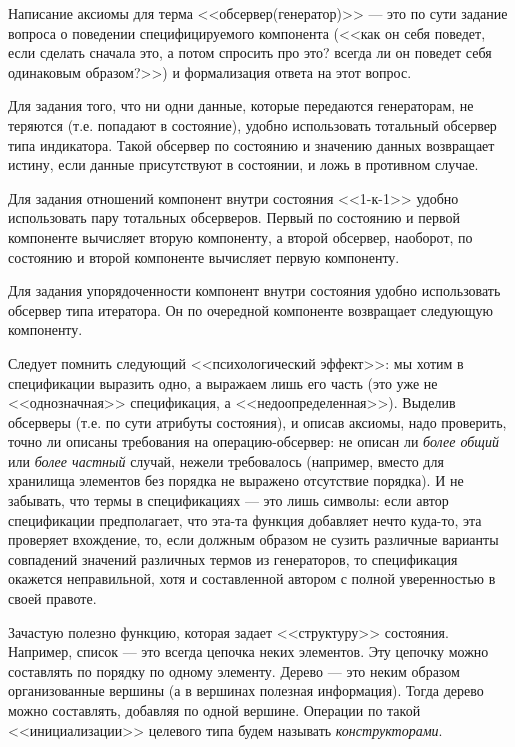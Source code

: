 Написание аксиомы для терма <<обсервер(генератор)>> --- это по сути задание вопроса о поведении специфицируемого компонента (<<как он себя поведет, если сделать сначала это, а потом спросить про это? всегда ли он поведет себя одинаковым образом?>>) и формализация ответа на этот вопрос.

Для задания того, что ни одни данные, которые передаются генераторам, не теряются (т.е. попадают в состояние), удобно использовать тотальный обсервер типа индикатора. Такой обсервер по состоянию и значению данных возвращает истину, если данные присутствуют в состоянии, и ложь в противном случае.

Для задания отношений компонент внутри состояния <<1-к-1>> удобно использовать пару тотальных обсерверов. Первый по состоянию и первой компоненте вычисляет вторую компоненту, а второй обсервер, наоборот, по состоянию и второй компоненте вычисляет первую компоненту.

Для задания упорядоченности компонент внутри состояния удобно использовать обсервер типа итератора. Он по очередной компоненте возвращает следующую компоненту.

Следует помнить следующий <<психологический эффект>>: мы хотим в спецификации выразить одно, а выражаем лишь его часть (это уже не <<однозначная>> спецификация, а <<недоопределенная>>). Выделив обсерверы (т.е. по сути атрибуты состояния), и описав аксиомы, надо проверить, точно ли описаны требования на операцию-обсервер: не описан ли \emph{более общий} или \emph{более частный} случай, нежели требовалось (например, вместо для хранилища элементов без порядка не выражено отсутствие порядка). И не забывать, что термы в спецификациях --- это лишь символы: если автор спецификации предполагает, что эта-та функция добавляет нечто куда-то, эта проверяет вхождение, то, если должным образом не сузить различные варианты совпадений значений различных термов из генераторов, то спецификация окажется неправильной, хотя и составленной автором с полной уверенностью в своей правоте.


Зачастую полезно функцию, которая задает <<структуру>> состояния. Например, список --- это всегда цепочка неких элементов. Эту цепочку можно составлять по порядку по одному элементу. Дерево --- это неким образом организованные вершины (а в вершинах полезная информация). Тогда дерево можно составлять, добавляя по одной вершине. Операции по такой <<инициализации>> целевого типа будем называть \emph{конструкторами}.

